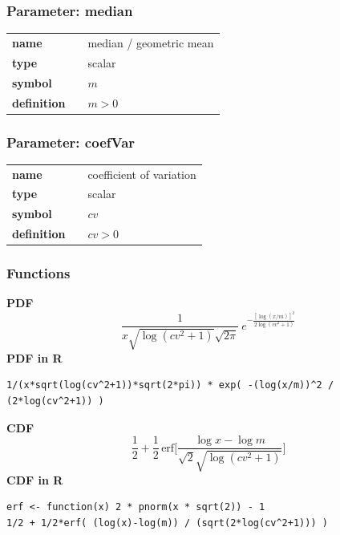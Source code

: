 \subsubsection*{Parameter: median}

\noindent\begin{tabular}{p{2cm}cl}
\textbf{name} & & median / geometric mean \\
\textbf{type} & & scalar \\
\textbf{symbol} & & $m$  \\
\textbf{definition} & & $m>0$
\end{tabular}
\subsubsection*{Parameter: coefVar}

\noindent\begin{tabular}{p{2cm}cl}
\textbf{name} & & coefficient of variation \\
\textbf{type} & & scalar \\
\textbf{symbol} & & $cv$  \\
\textbf{definition} & & $cv>0$
\end{tabular}
\subsubsection*{Functions}

\smallskip \noindent \hspace{.2cm} \textbf{PDF} 
\begin{equation*}\frac{1}{x\sqrt{\log(cv^2+1)}\sqrt{2\pi}}\ e^{-\frac{\left[\log (x/m)\right]^2}{2\log(cv^2+1)}}\end{equation*}
\smallskip \noindent \hspace{.2cm} \textbf{PDF in R}  
\begin{verbatim}1/(x*sqrt(log(cv^2+1))*sqrt(2*pi)) * exp( -(log(x/m))^2 / (2*log(cv^2+1)) )\end{verbatim}
\smallskip \noindent \hspace{.2cm} \textbf{CDF} 
\begin{equation*}\frac12 + \frac12\,\text{erf}\Big[\frac{\log x-\log m}{\sqrt{2}\sqrt{\log(cv^2+1)}}\Big]\end{equation*}
\smallskip \noindent \hspace{.2cm} \textbf{CDF in R}  
\begin{verbatim}
erf <- function(x) 2 * pnorm(x * sqrt(2)) - 1
1/2 + 1/2*erf( (log(x)-log(m)) / (sqrt(2*log(cv^2+1))) )\end{verbatim}

